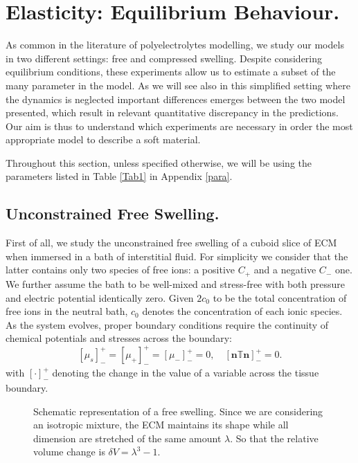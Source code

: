 \documentclass[runningheads]{llncs}
\begin{document}
\section{Elasticity: Equilibrium Behaviour.}
\label{eqtest}
As common in the literature of polyelectrolytes modelling, we study our models in two different settings: free and compressed swelling. Despite considering equilibrium conditions, these experiments allow us to estimate a subset of the many parameter in the model. As we will see also in this simplified setting where the dynamics is neglected important differences emerges between the two model presented, which result in relevant quantitative discrepancy in the predictions. Our aim is thus to understand which experiments are necessary in order the most appropriate model to describe a soft material.

Throughout this section, unless specified otherwise, we will be using the parameters listed in Table \ref{Tab1} in Appendix \ref{para}.

\subsection{Unconstrained Free Swelling.} 
\label{free}

First of all, we study the unconstrained free swelling of a cuboid slice of ECM when immersed in a bath of interstitial fluid. For simplicity we consider that the latter contains only two species of free ions: a positive $C_+$ and a negative $C_-$ one. We further assume the bath to be well-mixed and stress-free with both pressure and electric potential identically zero. Given $2c_0$ to be the total concentration of free ions in the neutral bath, $c_0$ denotes the concentration of each ionic species. As the system evolves, proper boundary conditions require the  continuity of chemical potentials and stresses across the boundary:
\begin{equation}
\left[\mu_s\right]^+_-=\left[\mu_+\right]^+_-=\left[\mu_-\right]^+_-=0, \quad \left[\mathbf{n} \mathbb{T}\mathbf{n}\right]^+_-=0.
\end{equation}
with $[\cdot]^+_-$ denoting the change in the value of a variable across the tissue boundary.

\begin{figure}
	\centering
	\def\svgwidth{0.9\linewidth}
	
	\caption{Schematic representation of a free swelling. Since we are considering an isotropic mixture, the ECM maintains its shape while all dimension are stretched of the same amount $\lambda$. So that the relative volume change is $\delta V = \lambda^3-1$. }
\end{figure}
\end{document}
